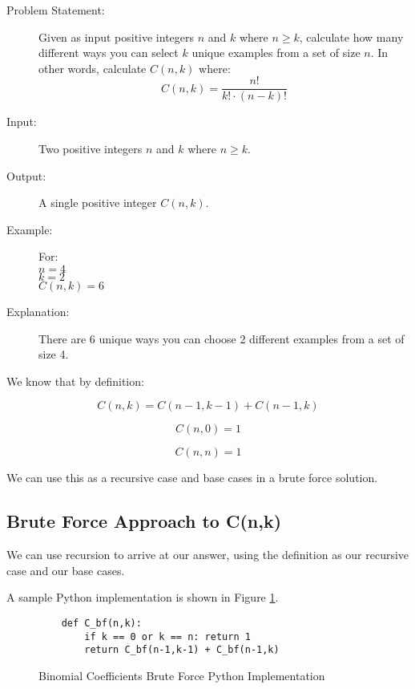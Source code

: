 \begin{description}
    \item[Problem Statement:]
        Given as input positive integers $n$ and $k$ where $n \geq k$, calculate how many different ways you can select $k$ unique examples from a set of size $n$.
        In other words, calculate $C(n,k)$ where: \[
            C(n,k) = \frac{n!}{k! \cdot (n-k)!}
            \]

    \item[Input:] 
        Two positive integers $n$ and $k$ where $n \geq k$.
        
    \item[Output:]
        A single positive integer $C(n,k)$.
        
    \item[Example:] For:\\
        $n = 4$\\
        $k = 2$\\
        $C(n,k) = 6$

    \item[Explanation:]
        There are 6 unique ways you can choose 2 different examples from a set of size 4.
        
\end{description}

We know that by definition:

$$C(n,k) = C(n-1,k-1) + C(n-1,k)$$

$$C(n,0) = 1$$

$$C(n,n) = 1$$

We can use this as a recursive case and base cases in a brute force solution.

\subsection{Brute Force Approach to C(n,k)}
We can use recursion to arrive at our answer, using the definition as our recursive case and our base cases.

A sample Python implementation is shown in Figure \ref{fig:binomial-bf}.

\begin{figure}[H]
    \centering
    \begin{lstlisting}
    def C_bf(n,k):
        if k == 0 or k == n: return 1
        return C_bf(n-1,k-1) + C_bf(n-1,k)
    \end{lstlisting}
    \caption{Binomial Coefficients Brute Force Python Implementation}
    \label{fig:binomial-bf}
\end{figure}

